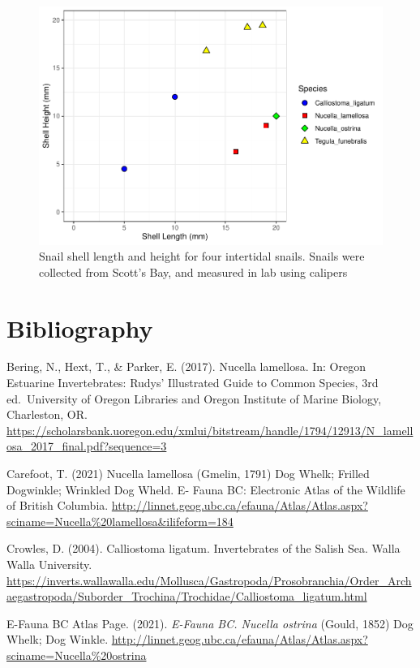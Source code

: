 \documentclass[
]{article}
\begin{document}
\begin{figure}
\includegraphics[width=0.8\linewidth,height=0.8\textheight]{Miller_Species_ID_Guide_files/figure-latex/unnamed-chunk-2-1} \caption{Snail shell length and height for four intertidal snails. Snails were collected from Scott's Bay, and measured in lab using calipers}\label{fig:unnamed-chunk-2}
\end{figure}

\newpage

\hypertarget{bibliography}{%
\section{Bibliography}\label{bibliography}}

Bering, N., Hext, T., \& Parker, E. (2017). Nucella lamellosa. In:
Oregon Estuarine Invertebrates: Rudys' Illustrated Guide to Common
Species, 3rd ed.~University of Oregon Libraries and Oregon Institute of
Marine Biology, Charleston, OR.
\url{https://scholarsbank.uoregon.edu/xmlui/bitstream/handle/1794/12913/N_lamellosa_2017_final.pdf?sequence=3}

Carefoot, T. (2021) Nucella lamellosa (Gmelin, 1791) Dog Whelk; Frilled
Dogwinkle; Wrinkled Dog Wheld. E- Fauna BC: Electronic Atlas of the
Wildlife of British Columbia.
\url{http://linnet.geog.ubc.ca/efauna/Atlas/Atlas.aspx?sciname=Nucella\%20lamellosa\&ilifeform=184}

Crowles, D. (2004). Calliostoma ligatum. Invertebrates of the Salish
Sea. Walla Walla University.
\url{https://inverts.wallawalla.edu/Mollusca/Gastropoda/Prosobranchia/Order_Archaegastropoda/Suborder_Trochina/Trochidae/Calliostoma_ligatum.html}

E-Fauna BC Atlas Page. (2021). \emph{E-Fauna BC. Nucella ostrina}
(Gould, 1852) Dog Whelk; Dog Winkle.
\url{http://linnet.geog.ubc.ca/efauna/Atlas/Atlas.aspx?sciname=Nucella\%20ostrina}
\end{document}
